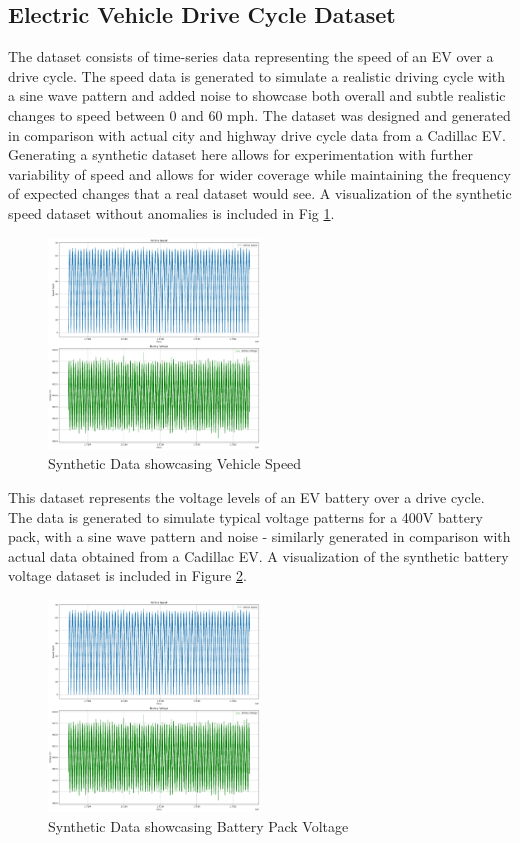 \documentclass[conference]{IEEEtran}
\begin{document}
\subsection{Electric Vehicle Drive Cycle Dataset}
The dataset consists of time-series data representing the speed of an EV over a drive cycle. The speed data is generated to simulate a realistic driving cycle with a sine wave pattern and added noise to showcase both overall and subtle realistic changes to speed between 0 and 60 mph. The dataset was designed and generated in comparison with actual city and highway drive cycle data from a Cadillac EV. Generating a synthetic dataset here allows for experimentation with further variability of speed and allows for wider coverage while maintaining the frequency of expected changes that a real dataset would see. A visualization of the synthetic speed dataset without anomalies is included in Fig \ref{aj_fig__1}.

\begin{figure}[htbp]
    \centering
    \includegraphics[width=0.5\textwidth]{aj_fig_1.png}
    \caption{Synthetic Data showcasing Vehicle Speed}
    \label{aj_fig__1}
\end{figure}

This dataset represents the voltage levels of an EV battery over a drive cycle. The data is generated to simulate typical voltage patterns for a 400V battery pack, with a sine wave pattern and noise - similarly generated in comparison with actual data obtained from a Cadillac EV. A visualization of the synthetic battery voltage dataset is included in Figure \ref{aj_fig__2}.

\begin{figure}[htbp]
    \centering
    \includegraphics[width=0.5\textwidth]{aj_fig_2.png}
    \caption{Synthetic Data showcasing Battery Pack Voltage}
    \label{aj_fig__2}
\end{figure}
\end{document}
